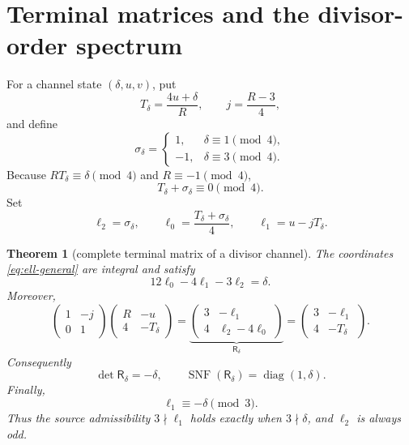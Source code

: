 \documentclass[11pt]{article}
\newtheorem{theorem}{Theorem}[section]
\theoremstyle{definition}
\theoremstyle{remark}
\newcommand{\diag}{\operatorname{diag}}
\newcommand{\SNF}{\operatorname{SNF}}
\newcommand{\1}{\mathbf 1}
\newcommand{\mat}[4]{\begin{pmatrix}#1&#2\\#3&#4\end{pmatrix}}
\begin{document}
\section{Terminal matrices and the divisor-order spectrum}

For a channel state $(\delta,u,v)$, put
\begin{equation}\label{eq:Tdelta}
 T_\delta=\frac{4u+\delta}{R},\qquad
 j=\frac{R-3}{4},
\end{equation}
and define
\begin{equation}\label{eq:sigdelta}
 \sigma_\delta=
 \begin{cases}
 1,&\delta\equiv1\pmod4,\\
 -1,&\delta\equiv3\pmod4.
 \end{cases}
\end{equation}
Because $RT_\delta\equiv\delta\pmod4$ and $R\equiv-1\pmod4$,
\begin{equation}\label{eq:T-sigma}
 T_\delta+\sigma_\delta\equiv0\pmod4.
\end{equation}
Set
\begin{equation}\label{eq:ell-general}
 \ell_2=\sigma_\delta,
 \qquad
 \ell_0=\frac{T_\delta+\sigma_\delta}{4},
 \qquad
 \ell_1=u-jT_\delta.
\end{equation}

\begin{theorem}[complete terminal matrix of a divisor channel]\label{thm:terminal-general}
The coordinates \eqref{eq:ell-general} are integral and satisfy
\begin{equation}\label{eq:lambda-delta}
 12\ell_0-4\ell_1-3\ell_2=\delta.
\end{equation}
Moreover,
\begin{equation}\label{eq:general-row-shear}
 \mat{1}{-j}{0}{1}
 \mat{R}{-u}{4}{-T_\delta}
 =
 \underbrace{\mat{3}{-\ell_1}{4}{\ell_2-4\ell_0}}
 _{\mathsf R_\delta}
 =\mat{3}{-\ell_1}{4}{-T_\delta}.
\end{equation}
Consequently
\begin{equation}\label{eq:terminal-snf}
 \det\mathsf R_\delta=-\delta,
 \qquad
 \SNF(\mathsf R_\delta)=\diag(1,\delta).
\end{equation}
Finally,
\begin{equation}\label{eq:ell1mod3}
 \ell_1\equiv-\delta\pmod3.
\end{equation}
Thus the source admissibility $3\nmid\ell_1$ holds exactly when
$3\nmid\delta$, and $\ell_2$ is always odd.
\end{theorem}
\end{document}
